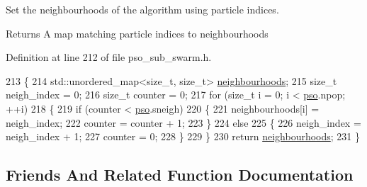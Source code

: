 Set the neighbourhoods of the algorithm using particle indices. 

\begin{DoxyReturn}{Returns}
A map matching particle indices to neighbourhoods 
\end{DoxyReturn}


Definition at line 212 of file pso\+\_\+sub\+\_\+swarm.\+h.


\begin{DoxyCode}
213     \{
214         std::unordered\_map<size\_t, size\_t> \hyperlink{classea_1_1_solver_3_01_p_s_os_00_01_t_00_01_f_00_01_c_01_4_a192926bdbed79d0cd68867c4f695cd92}{neighbourhoods};
215         \textcolor{keywordtype}{size\_t} neigh\_index = 0;
216         \textcolor{keywordtype}{size\_t} counter = 0;
217         \textcolor{keywordflow}{for} (\textcolor{keywordtype}{size\_t} i = 0; i < \hyperlink{classea_1_1_solver_3_01_p_s_os_00_01_t_00_01_f_00_01_c_01_4_a1f1aa62756a73565ebe0ca1fbc084ea5}{pso}.npop; ++i)
218         \{
219             \textcolor{keywordflow}{if} (counter < \hyperlink{classea_1_1_solver_3_01_p_s_os_00_01_t_00_01_f_00_01_c_01_4_a1f1aa62756a73565ebe0ca1fbc084ea5}{pso}.sneigh)
220             \{
221                 neighbourhoods[i] = neigh\_index;
222                 counter = counter + 1;
223             \}
224             \textcolor{keywordflow}{else}
225             \{
226                 neigh\_index = neigh\_index + 1;
227                 counter = 0;
228             \}
229         \}
230         \textcolor{keywordflow}{return} \hyperlink{classea_1_1_solver_3_01_p_s_os_00_01_t_00_01_f_00_01_c_01_4_a192926bdbed79d0cd68867c4f695cd92}{neighbourhoods};
231     \}
\end{DoxyCode}


\subsection{Friends And Related Function Documentation}
\mbox{\label{classea_1_1_solver_3_01_p_s_os_00_01_t_00_01_f_00_01_c_01_4_aa3dcae3fc6bad98284e958b7c320549c}} 
